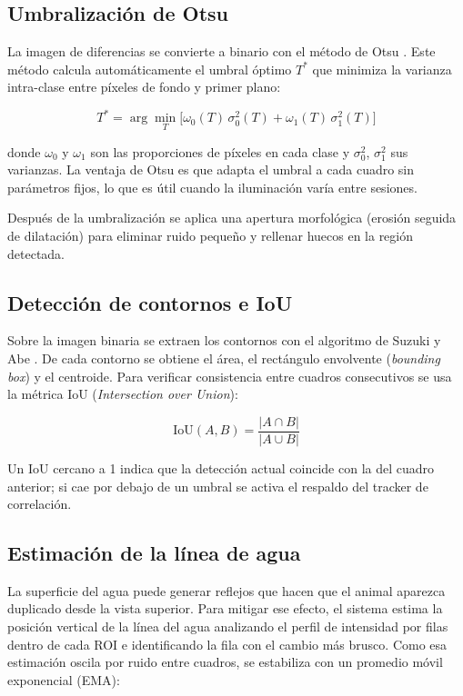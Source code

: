 \subsection{Umbralización de Otsu}

La imagen de diferencias se convierte a binario con el método de Otsu \cite{otsu1979}.
Este método calcula automáticamente el umbral óptimo $T^*$ que minimiza la varianza
intra-clase entre píxeles de fondo y primer plano:

\begin{equation}
    T^* = \arg\min_{T} \bigl[ \omega_0(T)\,\sigma_0^2(T) + \omega_1(T)\,\sigma_1^2(T) \bigr]
    \label{eq:otsu}
\end{equation}

donde $\omega_0$ y $\omega_1$ son las proporciones de píxeles en cada clase y $\sigma_0^2$,
$\sigma_1^2$ sus varianzas. La ventaja de Otsu es que adapta el umbral a cada cuadro
sin parámetros fijos, lo que es útil cuando la iluminación varía entre sesiones.

Después de la umbralización se aplica una apertura morfológica (erosión seguida de
dilatación) para eliminar ruido pequeño y rellenar huecos en la región detectada.

\subsection{Detección de contornos e IoU}

Sobre la imagen binaria se extraen los contornos con el algoritmo de Suzuki y Abe
\cite{suzuki1985}. De cada contorno se obtiene el área, el rectángulo envolvente
(\textit{bounding box}) y el centroide. Para verificar consistencia entre cuadros
consecutivos se usa la métrica IoU (\textit{Intersection over Union}):

\begin{equation}
    \text{IoU}(A, B) = \frac{|A \cap B|}{|A \cup B|}
    \label{eq:iou}
\end{equation}

Un IoU cercano a 1 indica que la detección actual coincide con la del cuadro anterior;
si cae por debajo de un umbral se activa el respaldo del tracker de correlación.

\subsection{Estimación de la línea de agua}

La superficie del agua puede generar reflejos que hacen que el animal aparezca duplicado
desde la vista superior. Para mitigar ese efecto, el sistema estima la posición vertical
de la línea del agua analizando el perfil de intensidad por filas dentro de cada ROI e
identificando la fila con el cambio más brusco. Como esa estimación oscila por ruido
entre cuadros, se estabiliza con un promedio móvil exponencial (EMA):

